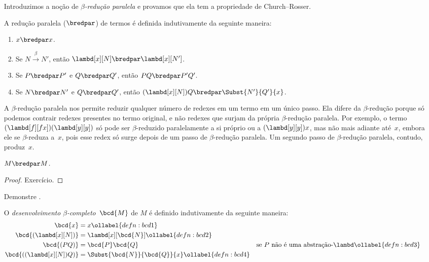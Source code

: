 \documentclass[../../../include/open-logic-section]{subfiles}
\begin{document}


Introduzimos a noção de \emph{$\beta$-redução paralela} e provamos que ela
tem a propriedade de Church--Rosser.

\begin{defn} 
  A redução paralela ($\bredpar$) de termos é definida indutivamente da
  seguinte maneira:
  \begin{enumerate}
    \item {} $x \bredpar x$.
    \item {} Se $N \xrightarrow{\beta} N'$, então
      $\lambd[x][N] \bredpar \lambd[x][N']$.
    \item {} Se $P \bredpar P'$ e $Q \bredpar Q'$, então
      $PQ \bredpar P'Q'$.
    \item {} Se $N \bredpar N'$ e $Q \bredpar Q'$, então
      $(\lambd[x][N])Q \bredpar \Subst{N'}{Q'}{x}$.
  \end{enumerate}
\end{defn}

A $\beta$-redução paralela nos permite reduzir qualquer número de redexes
em um termo em um único passo. Ela difere da $\beta$-redução porque só
podemos contrair redexes presentes no termo original, e não redexes que
surjam da própria $\beta$-redução paralela. Por exemplo, o termo
$(\lambd[f][fx])(\lambd[y][y])$ só pode ser $\beta$-reduzido paralelamente
a si próprio ou a $(\lambd[y][y])x$, mas não mais adiante até~$x$, embora
ele se $\beta$-reduza a~$x$, pois esse redex só surge depois de um passo de
$\beta$-redução paralela. Um segundo passo de $\beta$-redução paralela,
contudo, produz~$x$.

\begin{thm}
  $M \bredpar M$.
\end{thm}

\begin{proof}
  Exercício.
\end{proof}

\begin{prob}
Demonstre .
\end{prob}

\begin{defn}
  O \emph{desenvolvimento $\beta$-completo}~$\bcd{M}$ de $M$ é definido
  indutivamente da seguinte maneira:
  \begin{align}
    \bcd{x} &= x \ollabel{defn:bcd1} \\
    \bcd{(\lambd[x][N])} &= \lambd[x][\bcd{N}] \ollabel{defn:bcd2}\\
    \bcd{(PQ)} &= \bcd{P}\bcd{Q} && \text{se $P$ não é uma abstração-$\lambd$}
    \ollabel{defn:bcd3} \\
    \bcd{((\lambd[x][N])Q)} &= \Subst{\bcd{N}}{\bcd{Q}}{x} \ollabel{defn:bcd4}
  \end{align}
\end{defn}
\end{document}
